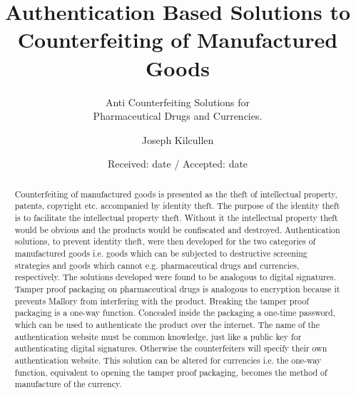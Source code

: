 \documentclass[smallextended]{svjour3}       	\smartqed  \usepackage{graphicx}
\begin{document}
\title{Authentication Based Solutions to\\ Counterfeiting of Manufactured Goods}
\subtitle{Anti Counterfeiting Solutions for\\ Pharmaceutical Drugs and Currencies.}
\author{Joseph Kilcullen}

\date{Received: date / Accepted: date}


\maketitle

\begin{abstract}
Counterfeiting of manufactured goods is presented as the theft of intellectual property, patents, copyright etc. accompanied by identity theft. The purpose of the identity theft is to facilitate the intellectual property theft. Without it the intellectual property theft would be obvious and the products would be confiscated and destroyed. Authentication solutions, to prevent identity theft, were then developed for the two categories of manufactured goods i.e. goods which can be subjected to destructive screening strategies and goods which cannot e.g. pharmaceutical drugs and currencies, respectively. The solutions developed were found to be analogous to digital signatures. Tamper proof packaging on pharmaceutical drugs is analogous to encryption because it prevents Mallory from interfering with the product. Breaking the tamper proof packaging is a one-way function. Concealed inside the packaging a one-time password, which can be used to authenticate the product over the internet. The name of the authentication website must be common knowledge, just like a public key for authenticating digital signatures. Otherwise the counterfeiters will specify their own authentication website. This solution can be altered for currencies i.e. the one-way function, equivalent to opening the tamper proof packaging, becomes the method of manufacture of the currency.


\end{abstract}
\end{document}
